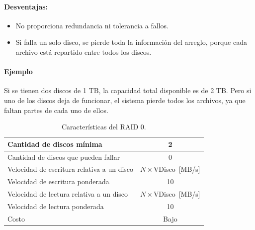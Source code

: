 \paragraph{Desventajas:}
\begin{itemize}
  \item No proporciona redundancia ni tolerancia a fallos.
  \item Si falla un solo disco, se pierde toda la información del arreglo, porque cada archivo está repartido entre todos los discos.
\end{itemize}

\paragraph{Ejemplo}
Si se tienen dos discos de 1 TB, la capacidad total disponible es de 2 TB. Pero si uno de los discos deja de funcionar, el sistema pierde todos los archivos, ya que faltan partes de cada uno de ellos.

\begin{table}[!ht]
  \centering
  \begin{tabular}{l|c}
    Cantidad de discos mínima & 2 \\\hline
    Cantidad de discos que pueden fallar & 0 \\ \hline
    Velocidad de escritura relativa a un disco & \(N\times\)VDisco~[MB/s] \\\hline
    Velocidad de escritura ponderada & 10 \\ \hline
    Velocidad de lectura relativa a un disco & \(N\times\)VDisco~[MB/s] \\ \hline
    Velocidad de lectura ponderada & 10 \\ \hline
    Costo & Bajo
  \end{tabular}
  \caption{Características del RAID 0.}
\end{table}
